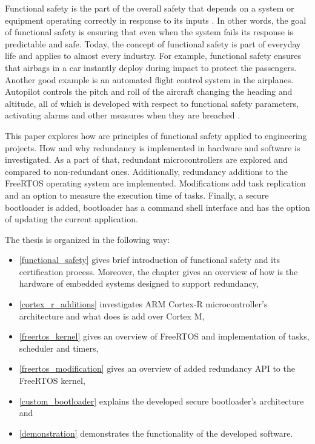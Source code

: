 Functional safety is the part of the overall safety that depends on a system or equipment operating correctly in response to its inputs \cite{func_safety_brief}. In other words, the goal of functional safety is ensuring that even when the system fails its response is predictable and safe. Today, the concept of functional safety is part of everyday life and applies to almost every industry. For example, functional safety ensures that airbags in a car instantly deploy during impact to protect the passengers. Another good example is an automated flight control system in the airplanes. Autopilot controls the pitch and roll of the aircraft changing the heading and altitude, all of which is developed with respect to functional safety parameters, activating alarms and other measures when they are breached \cite{func_safety_brief}.

This paper explores how are principles of functional safety applied to engineering projects. How and why redundancy is implemented in hardware and software is investigated. As a part of that, redundant microcontrollers are explored and compared to non-redundant ones. Additionally, redundancy additions to the FreeRTOS operating system are implemented. Modifications add task replication and an option to measure the execution time of tasks. Finally, a secure bootloader is added, bootloader has a command shell interface and has the option of updating the current application.

\noindent The thesis is organized in the following way:

\begin{itemize}

    \item \autoref{functional_safety} gives brief introduction of functional safety and its certification process. Moreover, the chapter gives an overview of how is the hardware of embedded systems designed to support redundancy,
    \item \autoref{cortex_r_additions} investigates ARM Cortex-R microcontroller's architecture and what does is add over Cortex M,
    \item \autoref{freertos_kernel} gives an overview of FreeRTOS and implementation of tasks, scheduler and timers,
    \item \autoref{freertos_modification} gives an overview of added redundancy API to the FreeRTOS kernel,
    \item \autoref{custom_bootloader} explains the developed secure bootloader's architecture and
    \item \autoref{demonstration} demonstrates the functionality of the developed software.
    
\end{itemize}
   